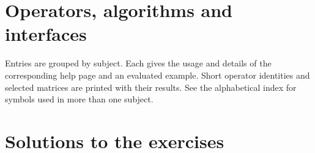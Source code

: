 \documentclass[paper=b5,fontsize=11pt,DIV=11,open=any,headinclude=true,numbers=noenddot]{scrbook}
\begin{document}
\chapter{Operators, algorithms and interfaces}
Entries are grouped by subject. Each gives the usage and details of
the corresponding help page and an evaluated example. Short operator
identities and selected matrices are printed with their results. See the alphabetical
index for symbols used in more than one subject.

\appendix


\chapter{Solutions to the exercises}



\printbibliography[heading=bibintoc]

\end{document}
